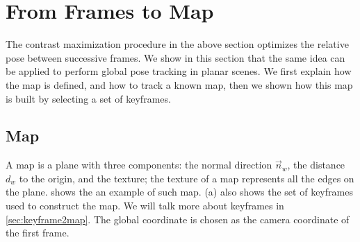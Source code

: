\section{From Frames to Map}
\label{sec:frame2map}
The contrast maximization procedure in the above section optimizes the
relative pose between successive frames. We show in this section that
the same idea can be applied to perform global pose tracking in planar
scenes. We first explain how the map is defined, and how to track a
known map, then we shown how this map is built by selecting a set of
keyframes.

\subsection{Map}
\label{sec:map}
A map is a plane with three components: the normal direction
$\vec{n}_w$, the distance $d_w$ to the origin, and the texture; the
texture of a map represents all the edges on the plane. 
shows the an example of such map. (a) also shows the set
of keyframes used to construct the map. We will talk more about
keyframes in \cref{sec:keyframe2map}. The global coordinate is chosen
as the camera coordinate of the first frame.

